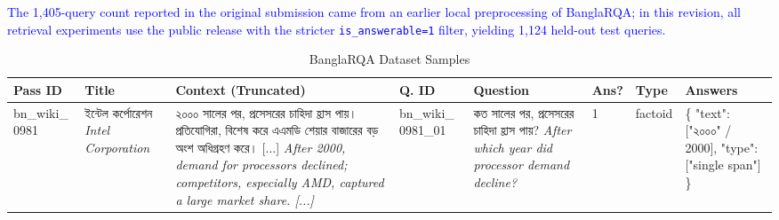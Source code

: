 \documentclass[manuscript,screen,review]{acmart}
\newcommand{\revise}[1]{\textcolor{blue}{#1}}
\newcommand{\bn}[1]{{\bengalifont #1}}
\begin{document}
\revise{The 1,405-query count reported in the original submission came from an earlier local preprocessing of BanglaRQA; in this revision, all retrieval experiments use the public release with the stricter \texttt{is\_answerable=1} filter, yielding 1,124 held-out test queries.}

\begin{table}[ht!]
    \centering
    \caption{BanglaRQA Dataset Samples}
    \label{tab:banglarqa_samples}
    \small %
    \setlength\tabcolsep{3pt} %
    \renewcommand{\arraystretch}{1.2} %
    
    \begin{tabularx}{\textwidth}{
        >{\raggedright\arraybackslash\scriptsize}p{1.2cm}   %
        >{\raggedright\arraybackslash\scriptsize}p{1.5cm}   %
        >{\scriptsize}X                                      %
        >{\raggedright\arraybackslash\scriptsize}p{1.2cm}   %
        >{\raggedright\arraybackslash\scriptsize}p{2.2cm}   %
        >{\centering\arraybackslash\scriptsize}p{0.6cm}     %
        >{\raggedright\arraybackslash\scriptsize}p{1.0cm}   %
        >{\raggedright\arraybackslash\tiny}p{3.0cm}         %
    }
        \toprule
        \textbf{Pass ID} & \textbf{Title} & \textbf{Context (Truncated)} & \textbf{Q. ID} & \textbf{Question} & \textbf{Ans?} & \textbf{Type} & \textbf{Answers} \\
        \midrule
        
        bn\_wiki\_ 0981 
        & \bn{ইন্টেল কর্পোরেশন} \newline \textit{Intel Corporation}
        & \bn{২০০০ সালের পর, প্রসেসরের চাহিদা হ্রাস পায়। প্রতিযোগিরা, বিশেষ করে এএমডি শেয়ার বাজারের বড় অংশ অধিগ্রহণ করে। [...]} \newline \textit{After 2000, demand for processors declined; competitors, especially AMD, captured a large market share. [...]} 
        & bn\_wiki\_ 0981\_01 
        & \bn{কত সালের পর, প্রসেসরের চাহিদা হ্রাস পায়?} \newline \textit{After which year did processor demand decline?}
        & 1 
        & factoid 
        & \ttfamily \{ "text": ["\bn{২০০০}" / 2000], "type": ["single span"] \} \\
        \midrule
        

\end{tabularx}
\end{table}
\end{document}
